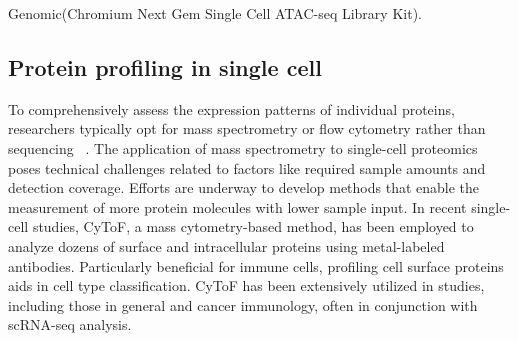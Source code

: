 Genomic(Chromium Next Gem Single Cell ATAC-seq Library Kit)\cite{satpathy2019massively}.


\subsection{Protein profiling in single cell}
\label{background:sec1:protein}
%
To comprehensively assess the expression patterns of individual proteins, researchers typically opt for mass spectrometry or flow cytometry rather than sequencing ~\citep{kim2022single}. The application of mass spectrometry to single-cell proteomics poses technical challenges related to factors like required sample amounts and detection coverage. Efforts are underway to develop methods that enable the measurement of more protein molecules with lower sample input. In recent single-cell studies, CyToF, a mass cytometry-based method, has been employed to analyze dozens of surface and intracellular proteins using metal-labeled antibodies. Particularly beneficial for immune cells, profiling cell surface proteins aids in cell type classification. CyToF has been extensively utilized in studies, including those in general and cancer immunology, often in conjunction with scRNA-seq analysis\citep{kashima2020single}.




